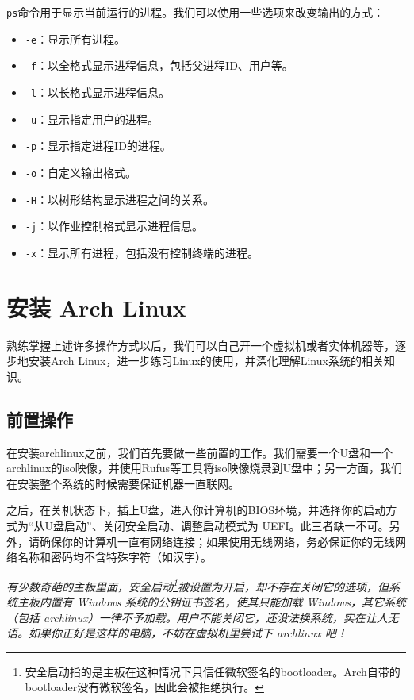 \documentclass[../main.tex]{subfiles}
\begin{document}
\texttt{ps}命令用于显示当前运行的进程。我们可以使用一些选项来改变输出的方式：
\begin{itemize}
  \item \texttt{-e}：显示所有进程。
  \item \texttt{-f}：以全格式显示进程信息，包括父进程ID、用户等。
  \item \texttt{-l}：以长格式显示进程信息。
  \item \texttt{-u}：显示指定用户的进程。
  \item \texttt{-p}：显示指定进程ID的进程。
  \item \texttt{-o}：自定义输出格式。
  \item \texttt{-H}：以树形结构显示进程之间的关系。
  \item \texttt{-j}：以作业控制格式显示进程信息。
  \item \texttt{-x}：显示所有进程，包括没有控制终端的进程。
\end{itemize}

\section{安装 Arch Linux}

熟练掌握上述许多操作方式以后，我们可以自己开一个虚拟机或者实体机器等，逐步地安装Arch Linux，进一步练习Linux的使用，并深化理解Linux系统的相关知识。

\subsection{前置操作}

在安装archlinux之前，我们首先要做一些前置的工作。我们需要一个U盘和一个archlinux的iso映像，并使用Rufus等工具将iso映像烧录到U盘中；另一方面，我们在安装整个系统的时候需要保证机器一直联网。

之后，在关机状态下，插上U盘，进入你计算机的BIOS环境，并选择你的启动方式为“从U盘启动”、关闭安全启动、调整启动模式为 UEFI。此三者缺一不可。另外，请确保你的计算机一直有网络连接；如果使用无线网络，务必保证你的无线网络名称和密码均不含特殊字符（如汉字）。

\emph{有少数奇葩的主板里面，安全启动\footnote{安全启动指的是主板在这种情况下只信任微软签名的bootloader。Arch自带的bootloader没有微软签名，因此会被拒绝执行。}被设置为开启，却不存在关闭它的选项，但系统主板内置有 Windows 系统的公钥证书签名，使其只能加载 Windows，其它系统（包括 archlinux）一律不予加载。用户不能关闭它，还没法换系统，实在让人无语。如果你正好是这样的电脑，不妨在虚拟机里尝试下 archlinux 吧！}
\end{document}
